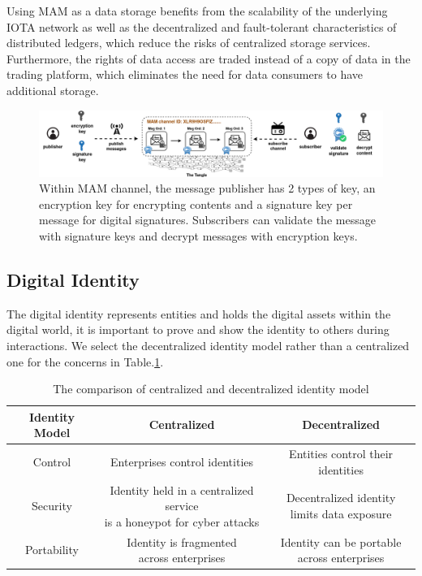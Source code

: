 \begin{spacing}{2.0}
Using MAM as a data storage benefits from the scalability of the underlying IOTA network as well as the decentralized and fault-tolerant characteristics of distributed ledgers, which reduce the risks of centralized storage services. Furthermore, the rights of data access are traded instead of a copy of data in the trading platform, which eliminates the need for data consumers to have additional storage.

\begin{figure}
    \centering
    \includegraphics[width=6.5in]{img/channel_and_key}
    \caption{Within MAM channel, the message publisher has 2 types of key, an encryption key for encrypting contents and a signature key per message for digital signatures. Subscribers can validate the message with signature keys and decrypt messages with encryption keys.}
    \label{fig:channel_and_key}
\end{figure}
\clearpage

\subsection{Digital Identity}
The digital identity represents entities and holds the digital assets within the digital world, it is important to prove and show the identity to others during interactions. We select the decentralized identity model rather than a centralized one for the concerns in Table.\ref{tab:did}.

\begin{table}[h]
	\caption{The comparison of centralized and decentralized identity model}
	\label{tab:did}
	\begin{tabular}{|c|c|c|}
	\hline
		\textbf{Identity Model} & \textbf{Centralized} & \textbf{Decentralized} \\
		\hline
		Control & Enterprises control identities & Entities control their identities \\
		\hline
		Security & \makecell{Identity held in a centralized service \\ is a  honeypot for cyber attacks} & \makecell{Decentralized identity \\ limits data exposure} \\
		\hline
		Portability & \makecell{Identity is fragmented \\ across enterprises} & \makecell{Identity can be portable \\ across enterprises} \\
		\hline
	\end{tabular}
\end{table}


\end{spacing}
